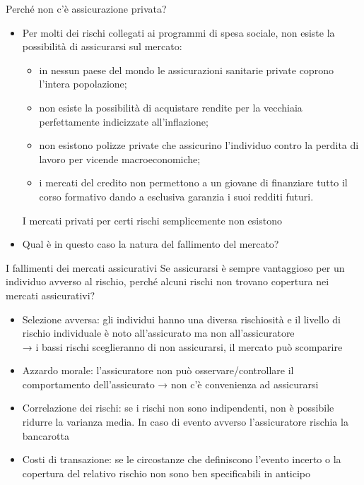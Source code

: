 \documentclass[aspectratio=64,12pt]{beamer}
\begin{document}
\begin{frame}{Perché non c'è assicurazione privata?}
\begin{itemize}
\item Per molti dei rischi collegati ai programmi di spesa sociale, non
esiste la possibilità di assicurarsi sul mercato:
\begin{itemize}
\item in nessun paese del mondo le assicurazioni sanitarie private coprono
l'intera popolazione;
\item non esiste la possibilità di acquistare rendite per la vecchiaia
perfettamente indicizzate all'inflazione;
\item non esistono polizze private che assicurino l'individuo contro la perdita
di lavoro per vicende macroeconomiche;
\item i mercati del credito non permettono a un giovane di finanziare tutto il
  corso formativo dando a esclusiva garanzia i suoi redditi futuri.
\end{itemize}
I mercati privati per certi rischi semplicemente non esistono
\item Qual è in questo caso la natura del \alert{fallimento del mercato}?
\end{itemize}
\end{frame}


\begin{frame}{I fallimenti dei mercati assicurativi}
Se assicurarsi è sempre vantaggioso per un individuo avverso al rischio, perché alcuni rischi non trovano copertura nei mercati assicurativi?

\begin{itemize}
\item \alert{Selezione avversa}: gli individui hanno una diversa rischiosità e il
livello di rischio individuale è noto all'assicurato ma non all'assicuratore\\[0pt]
→ i bassi rischi sceglieranno di non assicurarsi, il mercato può scomparire
\item \alert{Azzardo morale}: l'assicuratore non può osservare/controllare il
comportamento dell'assicurato
→ non c'è convenienza ad assicurarsi
\item \alert{Correlazione dei rischi}: se i rischi non sono indipendenti, non è
possibile ridurre la varianza media. In caso di evento avverso
l'assicuratore rischia la bancarotta
\item \alert{Costi di transazione}: se le circostanze che definiscono l'evento incerto o
la copertura del relativo rischio non sono ben specificabili in anticipo
\end{itemize}
\end{frame}
\end{document}
